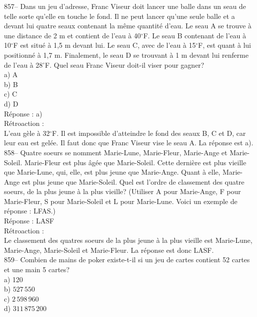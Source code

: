 ﻿\documentclass[letterpaper, 12pt]{article}
\begin{document}
857-- Dans un jeu d'adresse, Franc Viseur doit lancer une balle dans
un seau de telle sorte qu'elle en touche le fond.  Il ne peut lancer
qu'une seule balle et a devant lui quatre seaux contenant la m\^eme
quantit\'e d'eau.  Le seau A se trouve \`a une distance de 2 m et
contient de l'eau \`a 40$^{\circ}$F.  Le seau B contenant de l'eau
\`a 10$^{\circ}$F est situ\'e \`a 1,5 m devant lui.  Le seau C, avec
de l'eau \`a 15$^{\circ}$F, est quant \`a lui positionn\'e \`a 1,7
m. Finalement, le seau D se trouvant \`a 1 m devant lui renferme de
l'eau \`a 28$^{\circ}$F.
Quel seau Franc Viseur doit-il viser pour gagner?\\
a) A\\
b) B\\
c) C\\
d) D\\

R\'eponse : a)\\

R\'etroaction : \\
L'eau g\`ele \`a 32$^{\circ}$F.  Il est impossible d'atteindre le fond des
seaux B, C et D,
car leur eau est gel\'ee.  Il faut donc que Franc Viseur vise le seau A. La
r\'eponse est a).\\

858-- Quatre soeurs se nomment Marie-Lune, Marie-Fleur, Marie-Ange
et Marie-Soleil.  Marie-Fleur est plus \^ag\'ee que Marie-Soleil.
Cette derni\`ere est plus vieille que Marie-Lune, qui, elle, est
plus jeune que Marie-Ange.  Quant \`a elle, Marie-Ange est plus
jeune que Marie-Soleil. Quel est l'ordre de classement des quatre
soeurs, de la plus jeune \`a la plus vieille? (Utiliser A pour
Marie-Ange, F pour Marie-Fleur, S pour Marie-Soleil et L pour
Marie-Lune.
Voici un exemple de r\'eponse : LFAS.)\\

R\'eponse : LASF\\

R\'etroaction : \\
Le classement des quatres soeurs de la plus jeune \`a la plus vieille est
Marie-Lune, Marie-Ange, Marie-Soleil et Marie-Fleur.  La r\'eponse est donc
LASF.\\


859-- Combien de mains de poker existe-t-il si un jeu de cartes contient 52
cartes et une main 5 cartes?\\
a) 120\\
b) $527\,550$\\
c) $2\,598\,960$\\
d) $311\,875\,200$\\
\end{document}

